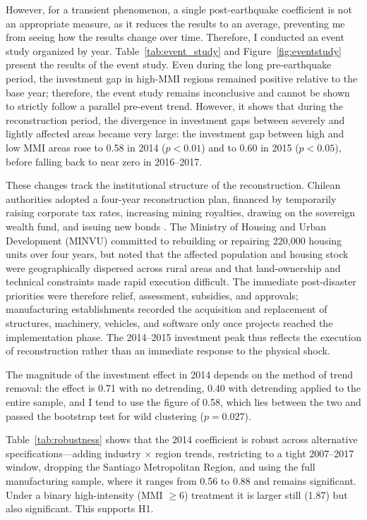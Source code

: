 \documentclass[12pt]{article}
\begin{document}


However, for a transient phenomenon, a single post-earthquake coefficient is not an appropriate
measure, as it reduces the results to an average, preventing me from seeing how the results change over
time. Therefore, I conducted an event study organized by year. Table~\ref{tab:event_study} and
Figure~\ref{fig:eventstudy} present the results of the event study. Even during the long pre-earthquake
period, the investment gap in high-MMI regions remained positive relative to the base year; therefore,
the event study remains inconclusive and cannot be shown to strictly follow a parallel pre-event trend.
However, it shows that during the reconstruction period, the divergence in investment gaps between
severely and lightly affected areas became very large: the investment gap between high and low MMI
areas rose to 0.58 in 2014 ($p < 0.01$) and to 0.60 in 2015 ($p < 0.05$), before falling back to near
zero in 2016--2017.

These changes track the institutional structure of the reconstruction. Chilean authorities adopted a
four-year reconstruction plan, financed by temporarily raising corporate tax rates, increasing mining
royalties, drawing on the sovereign wealth fund, and issuing new bonds \citep{govchile2010}. The
Ministry of Housing and Urban Development (MINVU) committed to rebuilding or repairing 220,000 housing
units over four years, but noted that the affected population and housing stock were geographically
dispersed across rural areas and that land-ownership and technical constraints made rapid execution
difficult. The immediate post-disaster priorities were therefore relief, assessment, subsidies, and
approvals; manufacturing establishments recorded the acquisition and replacement of structures,
machinery, vehicles, and software only once projects reached the implementation phase. The 2014--2015
investment peak thus reflects the execution of reconstruction rather than an immediate response to the
physical shock.

The magnitude of the investment effect in 2014 depends on the method of trend removal: the effect is
0.71 with no detrending, 0.40 with detrending applied to the entire sample, and I tend to use the
figure of 0.58, which lies between the two and passed the bootstrap test for wild clustering
($p=0.027$).

Table~\ref{tab:robustness} shows that the 2014 coefficient is robust across alternative
specifications---adding industry $\times$ region trends, restricting to a tight 2007--2017 window,
dropping the Santiago Metropolitan Region, and using the full manufacturing sample, where it ranges
from 0.56 to 0.88 and remains significant. Under a binary high-intensity (MMI $\geq 6$) treatment it is
larger still (1.87) but also significant. This supports H1.
\end{document}
